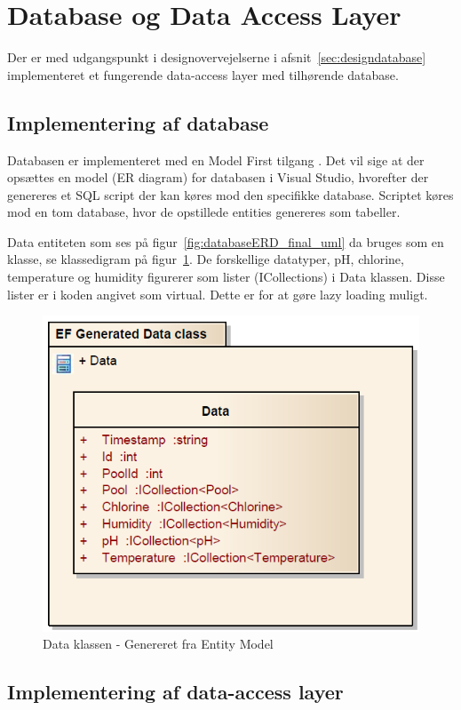 \section{Database og Data Access Layer}

Der er med udgangspunkt i designovervejelserne i afsnit~\ref{sec:designdatabase} implementeret et fungerende data-access layer med tilhørende database.

\subsection{Implementering af database}

Databasen er implementeret med en Model First tilgang \cite{microsoftdatadevelopercenter2016}. Det vil sige at der opsættes en model (ER diagram) for databasen i Visual Studio, hvorefter der genereres et SQL script der kan køres mod den specifikke database. Scriptet køres mod en tom database, hvor de opstillede entities genereres som tabeller.

Data entiteten som ses på figur~\ref{fig:databaseERD_final_uml} da bruges som en klasse, se klassedigram på figur~\ref{fig:efGeneratedData}. De forskellige datatyper, pH, chlorine, temperature og humidity figurerer som lister (ICollections) i Data klassen. Disse lister er i koden angivet som virtual. Dette er for at gøre lazy loading muligt.

\begin{figure}
\centering
\includegraphics[width=0.5\linewidth]{figs/implementering/efGeneratedData.PNG}
\caption{Data klassen - Genereret fra Entity Model}
\label{fig:efGeneratedData}
\end{figure}

\subsection{Implementering af data-access layer}

